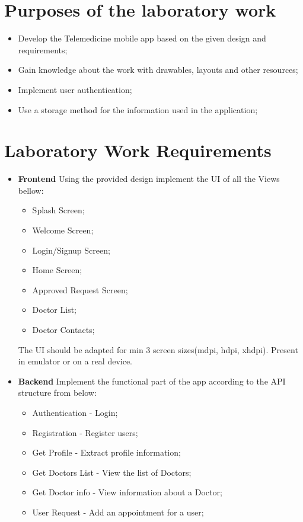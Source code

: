\section{Purposes of the laboratory work}
\begin{itemize}
	\item Develop the Telemedicine mobile app based on the given design and requirements; 
	\item Gain knowledge about the work with drawables, layouts and other resources;
    \item Implement user authentication;
    \item Use a storage method for the information used in the application;
\end{itemize}

\section{Laboratory Work Requirements}
\begin{itemize}
	\item \textbf{Frontend}
		  Using the provided design implement the UI of all the Views bellow:	
	      \begin{itemize}
		      \item Splash Screen;
		      \item Welcome Screen;
		      \item Login/Signup Screen;
		      \item Home Screen;
		      \item Approved Request Screen;
		      \item Doctor List;
		      \item Doctor Contacts;
	      \end{itemize}
      	  The UI should be adapted for min 3 screen sizes(mdpi, hdpi, xhdpi). Present in emulator or on a real device.
	\item \textbf{Backend}
		  Implement the functional part of the app according to the API structure from below:
	      \begin{itemize}
		      \item Authentication - Login;
		      \item Registration - Register users;
		      \item Get Profile - Extract profile information; 
		      \item Get Doctors List - View the list of Doctors;
		      \item Get Doctor info - View information about a Doctor;
		      \item User Request - Add an appointment for a user;
	      \end{itemize}
\end{itemize}

\clearpage